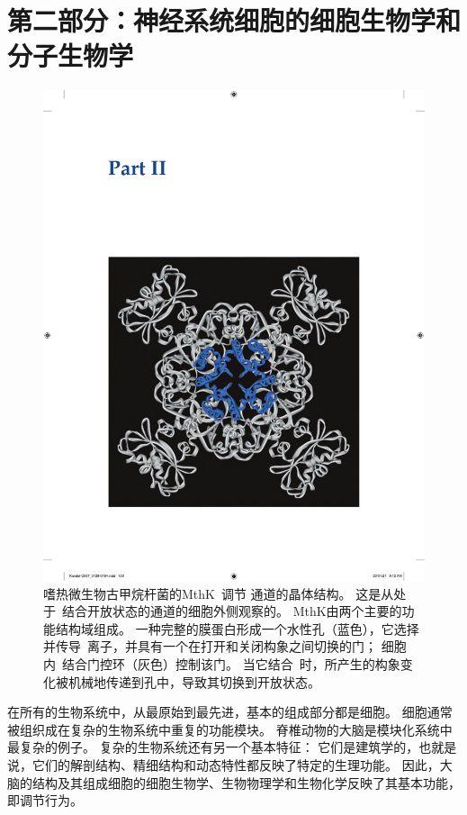 \chapter*{第二部分：神经系统细胞的细胞生物学和分子生物学}

\begin{figure}[htbp]
	\centering
	\includegraphics[width=0.9\linewidth]{chap07/fig_7_0}
	\caption{嗜热微生物古甲烷杆菌的MthK~调节 通道的晶体结构。
		这是从处于~结合开放状态的通道的细胞外侧观察的。
		MthK由两个主要的功能结构域组成。
		一种完整的膜蛋白形成一个水性孔（蓝色），它选择并传导~离子，并具有一个在打开和关闭构象之间切换的门；
		细胞内~结合门控环（灰色）控制该门。
		当它结合~时，所产生的构象变化被机械地传递到孔中，导致其切换到开放状态。}
	\label{fig:7_0}
\end{figure}


在所有的生物系统中，从最原始到最先进，基本的组成部分都是细胞。
细胞通常被组织成在复杂的生物系统中重复的功能模块。
脊椎动物的大脑是模块化系统中最复杂的例子。
复杂的生物系统还有另一个基本特征：
它们是建筑学的，也就是说，它们的解剖结构、精细结构和动态特性都反映了特定的生理功能。
因此，大脑的结构及其组成细胞的细胞生物学、生物物理学和生物化学反映了其基本功能，即调节行为。


